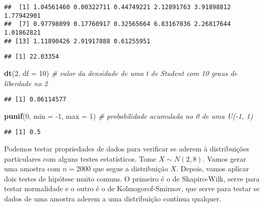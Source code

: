 \documentclass[
]{article}
\newenvironment{Shaded}{\begin{snugshade}}{\end{snugshade}}
\newcommand{\CommentTok}[1]{\textcolor[rgb]{0.56,0.35,0.01}{\textit{#1}}}
\newcommand{\DataTypeTok}[1]{\textcolor[rgb]{0.13,0.29,0.53}{#1}}
\newcommand{\DecValTok}[1]{\textcolor[rgb]{0.00,0.00,0.81}{#1}}
\newcommand{\FloatTok}[1]{\textcolor[rgb]{0.00,0.00,0.81}{#1}}
\newcommand{\KeywordTok}[1]{\textcolor[rgb]{0.13,0.29,0.53}{\textbf{#1}}}
\newcommand{\NormalTok}[1]{#1}
\begin{document}
\begin{verbatim}
##  [1] 1.04561460 0.00322711 0.44749221 2.12891763 3.91898812 1.77942901
##  [7] 0.97798099 0.17760917 0.32565664 6.83167036 2.26817644 1.01862821
## [13] 1.11890426 2.91917888 0.61255951
\end{verbatim}

\begin{Shaded}
\end{Shaded}

\begin{verbatim}
## [1] 22.03354
\end{verbatim}

\begin{Shaded}
\begin{Highlighting}[]
\KeywordTok{dt}\NormalTok{(}\DecValTok{2}\NormalTok{, }\DataTypeTok{df =} \DecValTok{10}\NormalTok{) }\CommentTok{# valor da densidade de uma t de Student com 10 graus de liberdade no 2}
\end{Highlighting}
\end{Shaded}

\begin{verbatim}
## [1] 0.06114577
\end{verbatim}

\begin{Shaded}
\begin{Highlighting}[]
\KeywordTok{punif}\NormalTok{(}\DecValTok{0}\NormalTok{, }\DataTypeTok{min =} \DecValTok{-1}\NormalTok{, }\DataTypeTok{max =} \DecValTok{1}\NormalTok{) }\CommentTok{# probabilidade acumulada no 0 de uma U(-1, 1)}
\end{Highlighting}
\end{Shaded}

\begin{verbatim}
## [1] 0.5
\end{verbatim}

Podemos testar propriedades de dados para verificar se aderem à
distribuições particulares com alguns testes estatísticos. Tome
\(X \sim N(2, 8)\). Vamos gerar uma amostra com \(n = 2000\) que segue a
distribuição \(X\). Depois, vamos aplicar dois testes de hipótese muito
comuns. O primeiro é o de Shapiro-Wilk, serve para testar normalidade e
o outro é o de Kolmogorof-Smirnov, que serve para testar se dados de uma
amostra aderem a uma distribuição contínua qualquer.
\end{document}

